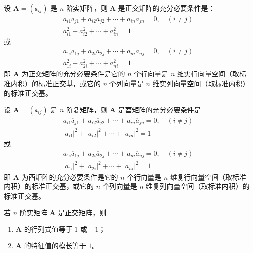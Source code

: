 \begin{theorem}
  设 $\bm{A} = (a_{ij})$ 是 $n$ 阶实矩阵，则 $\bm{A}$ 是正交矩阵的充分必要条件是：
  \begin{gather*}
    a_{i1}a_{j1} + a_{i2}a_{j2} + \cdots + a_{in}a_{jn} = 0, \quad (i \neq j) \\
    a_{i1}^{2} + a_{i2}^{2} + \cdots + a_{in}^{2} = 1
  \end{gather*}
  或
  \begin{gather*}
    a_{1i}a_{1j} + a_{2i}a_{2j} + \cdots + a_{ni}a_{nj} = 0, \quad (i \neq j) \\
    a_{1i}^{2} + a_{2i}^{2} + \cdots + a_{ni}^{2} = 1
  \end{gather*}
  即 $\bm{A}$ 为正交矩阵的充分必要条件是它的 $n$ 个行向量是 $n$ 维实行向量空间（取标准内积）的标准正交基，或它的 $n$ 个列向量是 $n$ 维实列向量空间（取标准内积）的标准正交基。
\end{theorem}

\begin{theorem}
  设 $\bm{A} = (a_{ij})$ 是 $n$ 阶复矩阵，则 $\bm{A}$ 是酉矩阵的充分必要条件是
  \begin{gather*}
    a_{i1}\overline{a}_{j1} + a_{i2}\overline{a}_{j2} + \cdots + a_{in}\overline{a}_{jn} = 0, \quad (i \neq j) \\
    {\vert a_{i1} \vert}^{2} + {\vert a_{i2} \vert}^{2} + \cdots + {\vert a_{in} \vert}^{2} = 1
  \end{gather*}
  或
  \begin{gather*}
    a_{1i}\overline{a}_{1j} + a_{2i}\overline{a}_{2j} + \cdots + a_{ni}\overline{a}_{nj} = 0, \quad (i \neq j) \\
    {\vert a_{1i} \vert}^{2} + {\vert a_{2i} \vert}^{2} + \cdots + {\vert a_{ni} \vert}^{2} = 1
  \end{gather*}
  即 $\bm{A}$ 为酉矩阵的充分必要条件是它的 $n$ 个行向量是 $n$ 维复行向量空间（取标准内积）的标准正交基，或它的 $n$ 个列向量是 $n$ 维复列向量空间（取标准内积）的标准正交基。
\end{theorem}

\begin{theorem}
  若 $n$ 阶实矩阵 $\bm{A}$ 是正交矩阵，则
  \begin{enumerate}
    \item $\bm{A}$ 的行列式值等于 $1$ 或 $-1$；
    \item $\bm{A}$ 的特征值的模长等于 $1$。
  \end{enumerate}
\end{theorem}

